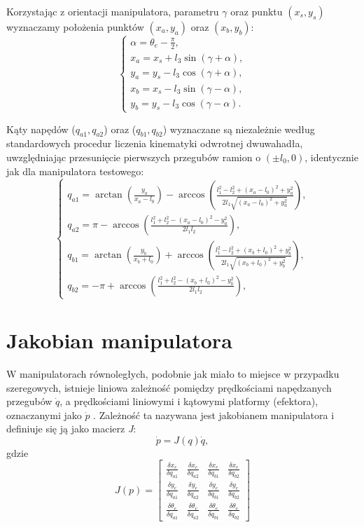 \documentclass[printmode]{mgr}
\begin{document}
Korzystając z orientacji manipulatora, parametru $\gamma$ oraz punktu $(x_s, y_s)$ wyznaczamy położenia punktów $(x_a, y_a)$ oraz $(x_b, y_b)$:
\begin{equation}
\begin{cases}
\alpha = \theta_e - \frac{\pi}{2}, \\
x_a = x_s + l_3\sin(\gamma + \alpha),\\
y_a = y_s - l_3\cos(\gamma + \alpha),\\
x_b = x_s - l_3\sin(\gamma - \alpha),\\
y_b = y_s - l_3\cos(\gamma - \alpha).
\end{cases}
\label{eq:kinematyka_odwrotna3}
\end{equation}

Kąty napędów ($q_{a1}, q_{a2}$) oraz ($q_{b1}, q_{b2}$)
wyznaczane są niezależnie według standardowych procedur liczenia kinematyki odwrotnej dwuwahadła, uwzględniając przesunięcie pierwszych
przegubów ramion o $(\pm l_0, 0)$, identycznie jak dla manipulatora testowego:
\begin{equation}
\begin{cases}
q_{a1} = \arctan(\frac{y_a}{x_a-l_0})-\arccos(\frac{l_1^2-l_2^2+(x_a-l_0)^2+y_a^2}{2l_1\sqrt{(x_a-l_0)^2+y_a^2}}),\\
q_{a2} = \pi - \arccos(\frac{l_1^2+l_2^2-(x_a-l_0)^2-y_a^2}{2l_1l_2}),\\
q_{b1} = \arctan(\frac{y_b}{x_b+l_0}) + \arccos(\frac{l_1^2-l_2^2+(x_b+l_0)^2+y_b^2}{2l_1\sqrt{(x_b+l_0)^2+y_b^2}}),\\
q_{b2} = -\pi + \arccos(\frac{l_1^2+l_2^2-(x_b+l_0)^2-y_b^2}{2l_1l_2}),
\end{cases}
\label{eq:kinematyka_odwrotna}
\end{equation}

\section{Jakobian manipulatora}\label{sec:jakobian}
W manipulatorach równoległych, podobnie jak miało to miejsce w przypadku szeregowych, istnieje liniowa zależność pomiędzy prędkościami
napędzanych przegubów $\dot{q}$, a prędkościami liniowymi i kątowymi platformy (efektora), oznaczanymi jako $\dot{p}$ \cite{handbook}.
Zależność ta nazywana jest jakobianem manipulatora i definiuje się ją jako macierz \emph{J}:
\begin{equation}
\dot{p}=J(q)\dot{q},
\label{eq:jakobian}
\end{equation}
gdzie
\begin{equation}
J(p) = 
\begin{bmatrix}
\frac{\delta x_e}{\delta q_{a1}} & \frac{\delta x_e}{\delta q_{a2}} & \frac{\delta x_e}{\delta q_{b1}} & \frac{\delta x_e}{\delta q_{b2}} \\
\frac{\delta y_e}{\delta q_{a1}} & \frac{\delta y_e}{\delta q_{a2}} & \frac{\delta y_e}{\delta q_{b1}} & \frac{\delta y_e}{\delta q_{b2}} \\
\frac{\delta \theta_e}{\delta q_{a1}} & \frac{\delta \theta_e}{\delta q_{a2}} & \frac{\delta \theta_e}{\delta q_{b1}} & \frac{\delta \theta_e}{\delta q_{b2}}
\end{bmatrix}
\label{eq:jakobian2}
\end{equation}
\end{document}
